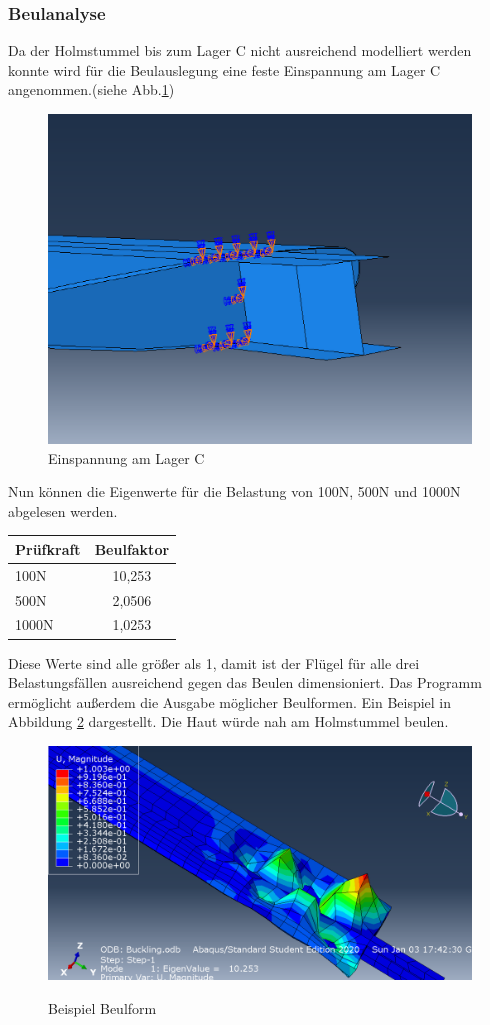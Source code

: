 \subsubsection{Beulanalyse}
Da der Holmstummel bis zum Lager C nicht ausreichend modelliert werden konnte wird für die Beulauslegung eine feste Einspannung am Lager C angenommen.(siehe Abb.\ref{BEinspannung})
\begin{figure}[h]
 \centering
 \includegraphics[scale=0.4]{Bilder/Beuleinspannung}
 \caption{Einspannung am Lager C}
 \label{BEinspannung}
\end{figure}
Nun können die Eigenwerte für die Belastung von 100N, 500N und 1000N abgelesen werden.
\begin{center}
\begin{tabular}[h]{l|c}
Prüfkraft&Beulfaktor\\
\hline
100N&10,253\\
500N&2,0506\\
1000N&1,0253\\
\end{tabular}
\end{center}
\noindent
Diese Werte sind alle größer als 1, damit ist der Flügel für alle drei Belastungsfällen ausreichend gegen das Beulen dimensioniert.
Das Programm ermöglicht außerdem die Ausgabe möglicher Beulformen. Ein Beispiel in Abbildung \ref{Beulform} dargestellt. Die Haut würde nah am Holmstummel beulen. 
\begin{figure}[h]
 \centering
 \includegraphics[scale=0.4]{Bilder/Beulen100N}
 \label{Beulform}
 \caption{Beispiel Beulform}
\end{figure}
\newpage

 

  
